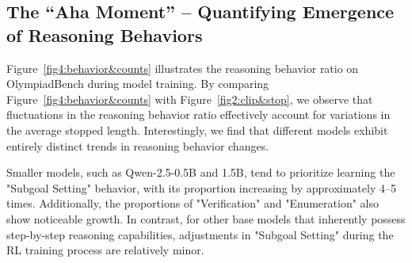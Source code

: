 
\subsection{The ``Aha Moment'' -- Quantifying Emergence of Reasoning Behaviors} 
Figure~\ref{fig4:behavior&counts} illustrates the reasoning behavior ratio on OlympiadBench during model training.
By comparing Figure~\ref{fig4:behavior&counts} with Figure~\ref{fig2:clip&stop}, we observe that fluctuations in the reasoning behavior ratio effectively account for variations in the average stopped length. Interestingly, we find that different models exhibit entirely distinct trends in reasoning behavior changes. 





Smaller models, such as Qwen-2.5-0.5B and 1.5B, tend to prioritize learning the "Subgoal Setting" behavior, with its proportion increasing by approximately 4–5 times. Additionally, the proportions of "Verification" and "Enumeration" also show noticeable growth. In contrast, for other base models that inherently possess step-by-step reasoning capabilities, adjustments in "Subgoal Setting" during the RL training process are relatively minor.

